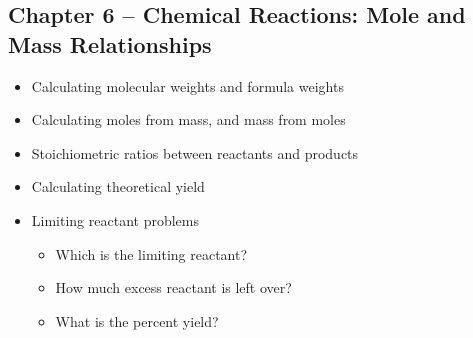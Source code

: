 \documentclass[12pt, letterpaper]{memoir}
\begin{document}
	\subsection*{Chapter 6 -- Chemical Reactions: Mole and Mass Relationships}
	\begin{itemize}
		\item Calculating molecular weights and formula weights
		\item Calculating moles from mass, and mass from moles
		\item Stoichiometric ratios between reactants and products
		\item Calculating theoretical yield
		\item Limiting reactant problems
		\begin{itemize}
			\item Which is the limiting reactant?
			\item How much excess reactant is left over?
			\item What is the percent yield?
		\end{itemize}
	\end{itemize}
\end{document}
